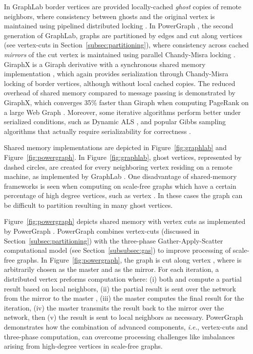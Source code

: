 \documentclass[reprint,twocolumn,showpacs,preprintnumbers,amsmath, aps,pre,amssymb]{revtex4-1}
\begin{document}
In GraphLab \cite{Low2012} border vertices are provided locally-cached \textit{ghost} copies of remote neighbors, where consistency between ghosts and the original vertex is maintained using pipelined distributed locking \cite{Dijkstra1971}.  In PowerGraph \cite{Gonzalez2012}, the second generation of GraphLab, graphs are partitioned by edges and cut along vertices (see vertex-cuts in Section~\ref{subsec:partitioning}), where consistency across cached \textit{mirrors} of the cut vertex is maintained using parallel Chandy-Misra locking \cite{Chandy1984}.  GiraphX is a Giraph derivative with a synchronous shared memory implementation \cite{Tasci2013}, which again provides serialization through Chandy-Misra locking of border vertices, although without local cached copies.  The reduced overhead of shared memory compared to message passing is demonstrated by GiraphX, which converges 35\% faster than Giraph when computing PageRank on a large Web Graph \cite{Tasci2013}.  Moreover, some iterative algorithms perform better under serialized conditions, such as Dynamic ALS \cite{Zhou2008,Low2012}, and popular Gibbs sampling algorithms that actually require serializability for correctness \cite{Gonzalez2011}.  

Shared memory implementations are depicted in Figure~\ref{fig:graphlab} and Figure~\ref{fig:powergraph}.  In Figure~\ref{fig:graphlab}, ghost vertices, represented by dashed circles, are created for every neighboring vertex residing on a remote machine, as implemented by GraphLab \cite{Low2012}.  One disadvantage of shared-memory frameworks is seen when computing on scale-free graphs which have a certain percentage of high degree vertices, such as vertex . In these cases the graph can be difficult to partition \cite{Leskovec2009} resulting in many ghost vertices.

Figure~\ref{fig:powergraph} depicts shared memory with vertex cuts as implemented by PowerGraph \cite{Gonzalez2012}.  PowerGraph combines vertex-cuts (discussed in Section~\ref{subsec:partitioning}) with the three-phase Gather-Apply-Scatter computational model (see Section~\ref{subsubsec:gas}) to improve processing of scale-free graphs.  In Figure~\ref{fig:powergraph}, the graph is cut along vertex , where  is arbitrarily chosen as the master and  as the mirror.  For each iteration, a distributed vertex preforms computation where: (i) both  and  compute a partial result based on local neighbors, (ii) the partial result is sent over the network from the mirror  to the master , (iii) the master computes the final result for the iteration, (iv) the master transmits the result back to the mirror over the network, then (v) the result is sent to local neighbors as necessary.  PowerGraph demonstrates how the combination of advanced components, {\em i.e.}, vertex-cuts and three-phase computation, can overcome processing challenges like imbalances arising from high-degree vertices in scale-free graphs.  
\end{document}
